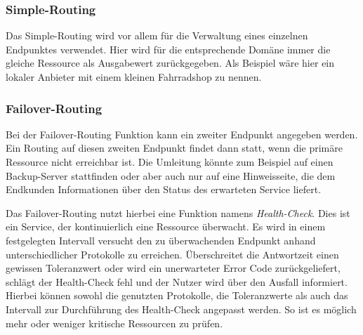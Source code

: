 \subsubsection{Simple-Routing}
Das Simple-Routing wird vor allem für die Verwaltung eines einzelnen Endpunktes verwendet. Hier wird für die entsprechende Domäne immer die gleiche Ressource als Ausgabewert zurückgegeben. Als Beispiel wäre hier ein lokaler Anbieter mit einem kleinen Fahrradshop zu nennen.

\subsubsection{Failover-Routing}
Bei der Failover-Routing Funktion kann ein zweiter Endpunkt angegeben werden. Ein Routing auf diesen zweiten Endpunkt findet dann statt, wenn die primäre Ressource nicht erreichbar ist. Die Umleitung könnte zum Beispiel auf einen Backup-Server stattfinden oder aber auch nur auf eine Hinweisseite, die dem Endkunden Informationen über den Status des erwarteten Service liefert. 

Das Failover-Routing nutzt hierbei eine Funktion namens \textit{Health-Check}. Dies ist ein Service, der kontinuierlich eine Ressource überwacht. Es wird in einem festgelegten Intervall versucht den zu überwachenden Endpunkt anhand unterschiedlicher Protokolle zu erreichen. Überschreitet die Antwortzeit einen gewissen Toleranzwert oder wird ein unerwarteter Error Code zurückgeliefert, schlägt der Health-Check fehl und der Nutzer wird über den Ausfall informiert. Hierbei können sowohl die genutzten Protokolle, die Toleranzwerte als auch das Intervall zur Durchführung des Health-Check angepasst werden. So ist es möglich mehr oder weniger kritische Ressourcen zu prüfen.

\subsubsection{}